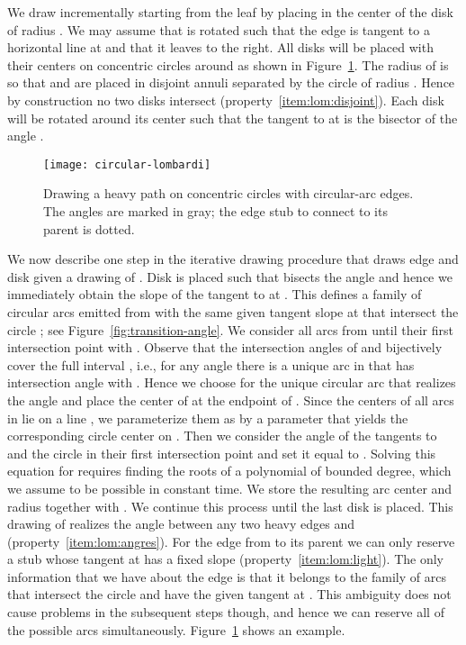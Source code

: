 \documentclass[11pt]{article}
\newenvironment{proof}{\noindent{\bf Proof:}}{\bigskip} \makeatletter
\begin{document}
\begin{proof}
  We draw  incrementally starting from the leaf  by placing
   in the center  of the disk  of radius . We may assume that  is rotated such that the edge 
  is tangent to a horizontal line at  and that it leaves  to
  the right. All disks  will be placed with their
  centers  on concentric circles 
  around  as shown in Figure~\ref{fig:heavy-lombardi}. 
	The radius of  is  so that  and  are placed in disjoint annuli separated by the circle  of radius . Hence by construction no two disks intersect
  (property~\ref{item:lom:disjoint}). Each disk  will be rotated
  around its center such that the tangent to  at  is the
  bisector of the angle .

	\begin{figure}[tb]
    \centering
    \texttt{[image: circular-lombardi]}
    \caption{Drawing a heavy path  on concentric circles with
      circular-arc edges. The angles  are marked in gray;
      the edge stub to connect  to its parent is dotted.}
    \label{fig:heavy-lombardi}
  \end{figure}

  We now describe one step in the iterative drawing procedure that draws
  edge  and disk  given a drawing of . Disk  is placed such that  bisects the angle
   and hence we immediately obtain the slope of the tangent to  at .
  This defines a family  of circular arcs emitted from  with the same given tangent slope at 
  that intersect the circle ; see
  Figure~\ref{fig:transition-angle}. We consider all arcs from 
  until their first intersection point with . Observe that
  the intersection angles of  and  bijectively
  cover the full interval , i.e., for any angle  there is a unique arc in  that has
  intersection angle  with . Hence we choose for
   the unique circular arc that realizes the angle
   and place the center  of  at
  the endpoint of . 
	Since the centers of all arcs  in  lie on a line , we parameterize them as  by a parameter  that yields the corresponding circle center on . 
	Then we consider the angle of the tangents to  and the circle  in their first intersection point  and set it equal to . 
	Solving this equation for  requires finding the roots of a polynomial of bounded degree, which we assume to be possible in constant time.
	We store the resulting arc center and radius together with .
  We continue this process until the last disk
   is placed. This drawing of  realizes the angle
   between any two heavy edges  and 
  (property~\ref{item:lom:angres}). For the edge from 
  to its parent  we can only reserve a stub whose tangent at  has
  a fixed slope
  (property~\ref{item:lom:light}).
	The only information that we have about the edge  is that it belongs to the family  of arcs that intersect the circle  and have the given tangent at . 
	This ambiguity does not cause problems in the subsequent steps though, and hence we can reserve all of the possible arcs simultaneously.
	Figure~\ref{fig:heavy-lombardi} shows an example.


\end{proof}
\end{document}
